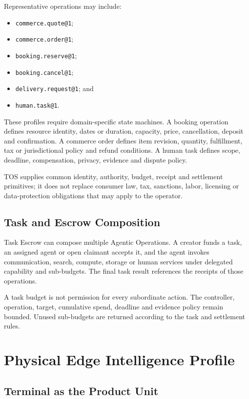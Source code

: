 \documentclass[11pt,oneside]{article}
\newcommand{\opid}[1]{\texttt{#1}}
\begin{document}
Representative operations may include:

\begin{itemize}
  \item \opid{commerce.quote@1};
  \item \opid{commerce.order@1};
  \item \opid{booking.reserve@1};
  \item \opid{booking.cancel@1};
  \item \opid{delivery.request@1}; and
  \item \opid{human.task@1}.
\end{itemize}

These profiles require domain-specific state machines. A booking operation defines resource
identity, dates or duration, capacity, price, cancellation, deposit and confirmation. A
commerce order defines item revision, quantity, fulfillment, tax or jurisdictional policy and
refund conditions. A human task defines scope, deadline, compensation, privacy, evidence and
dispute policy.

TOS supplies common identity, authority, budget, receipt and settlement primitives; it does
not replace consumer law, tax, sanctions, labor, licensing or data-protection obligations that
may apply to the operator.

\subsection{Task and Escrow Composition}

Task Escrow can compose multiple Agentic Operations. A creator funds a task, an assigned
agent or open claimant accepts it, and the agent invokes communication, search, compute,
storage or human services under delegated capability and sub-budgets. The final task result
references the receipts of those operations.

A task budget is not permission for every subordinate action. The controller, operation,
target, cumulative spend, deadline and evidence policy remain bounded. Unused sub-budgets are
returned according to the task and settlement rules.
\section{Physical Edge Intelligence Profile}

\subsection{Terminal as the Product Unit}
\end{document}
